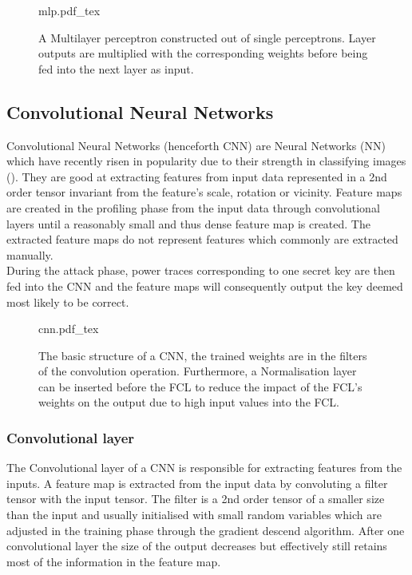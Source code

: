\documentclass[journal]{IEEEtran}
\begin{document}
\begin{figure}[ht]
	\centering
	\def\svgwidth{\columnwidth}
	{mlp.pdf_tex}
	\caption[A MLP built out of multiple single perceptrons]{A Multilayer perceptron constructed out of single perceptrons. Layer outputs are multiplied with the corresponding weights before being fed into the next layer as input.}
	\label{fig:mlp}
\end{figure}

\subsection{Convolutional Neural Networks}
Convolutional Neural Networks (henceforth CNN) are Neural Networks (NN) which have recently risen in popularity due to their strength in classifying images (\cite{cnn-beats-svm:alex}). They are good at extracting features from input data represented in a 2nd order tensor invariant from the feature's scale, rotation or vicinity. Feature maps are created in the profiling phase from the input data through convolutional layers until a reasonably small and thus dense feature map is created. The extracted feature maps do not represent features which commonly are extracted manually. \\
During the attack phase, power traces corresponding to one secret key are then fed into the CNN and the feature maps will consequently output the key deemed most likely to be correct. 

\begin{figure}[ht]
	\centering
	\def\svgwidth{\columnwidth}
	{cnn.pdf_tex}
	\caption[Short description of a CNN]{The basic structure of a CNN, the trained weights are in the filters of the convolution operation. Furthermore, a Normalisation layer can be inserted before the FCL to reduce the impact of the FCL's weights on the output due to high input values into the FCL.}
	\label{fig:cnn}
\end{figure}

\subsubsection{Convolutional layer}
The Convolutional layer of a CNN is responsible for extracting features from the inputs. A feature map is extracted from the input data by convoluting a filter tensor with the input tensor. The filter is a 2nd order tensor of a smaller size than the input and usually initialised with small random variables which are adjusted in the training phase through the gradient descend algorithm. After one convolutional layer the size of the output decreases but effectively still retains most of the information in the feature map.  
\end{document}
